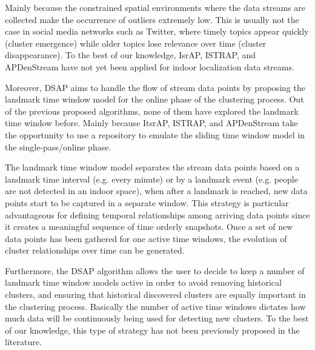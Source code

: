 Mainly because the constrained spatial environments where the data streams are collected make the occurrence of outliers extremely low. This is usually not the case in social media networks such as Twitter, where timely topics appear quickly (cluster emergence) while older topics lose relevance over time (cluster disappearance). To the best of our knowledge, IsrAP, ISTRAP, and APDenStream have not yet been applied for indoor localization data streams. 

Moreover, DSAP aims to handle the flow of stream data points by proposing the landmark time window model for the online phase of the clustering process. Out of the previous proposed algorithms, none of them have explored the landmark time window before. Mainly because ItsrAP, ISTRAP, and APDenStream take the opportunity to use a repository to emulate the sliding time window model in the single-pass/online phase. 

The landmark time window model separates the stream data points based on a landmark time interval (e.g. every minute) or by a landmark event (e.g. people are not detected in an indoor space), when after a landmark is reached, new data points start to be captured in a separate window. This strategy is particular advantageous for defining temporal relationships among arriving data points since it creates a meaningful sequence of time orderly snapshots. Once a set of new data points has been gathered for one active time windows, the evolution of cluster relationships over time can be generated. 

Furthermore, the DSAP algorithm allows the user to decide to keep a number of landmark time window models active in order to avoid removing historical clusters, and ensuring that historical discovered clusters are equally important in the clustering process. Basically the number of active time windows dictates how much data will be continuously being used for detecting new clusters. To the best of our knowledge, this type of strategy has not been previously proposed in the literature.



